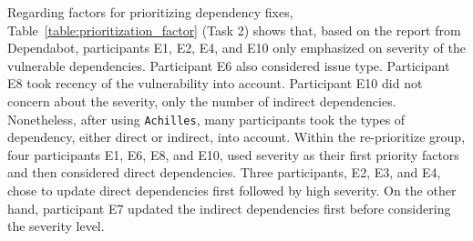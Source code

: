 \documentclass[conference]{IEEEtran}
\begin{document}
	Regarding factors for prioritizing dependency fixes, Table~\ref{table:prioritization_factor} (Task 2) shows that, based on the report from Dependabot, participants E1, E2, E4, and E10 only emphasized on severity of the vulnerable dependencies. Participant E6 also considered issue type. Participant E8 took recency of the vulnerability into account. Participant E10 did not concern about the severity, only the number of indirect dependencies.
	Nonetheless, after using \texttt{Achilles}, many participants took the types of dependency, either direct or indirect, into account. Within the re-prioritize group, four participants E1, E6, E8, and E10, used severity as their first priority factors and then considered direct dependencies. Three participants, E2, E3, and E4, chose to update direct dependencies first followed by high severity. On the other hand, participant E7 updated the indirect dependencies first before considering the severity level.
	
\end{document}
